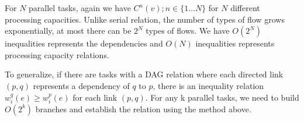 For $N$ parallel tasks, again we have $C^n(v); n\in\{1\dots N\}$ for $N$ different processing capacities. Unlike serial relation, the number of types of flow grows exponentially, at most there can be $2^N$ types of flows. We have $O(2^N)$ inequalities represents the dependencies and $O(N)$ inequalities represents processing capacity relations.

To generalize, if there are tasks with a DAG relation where each directed link $(p,q)$ represents a dependency of $q$ to $p$, there is an inequality relation $w_i^q(e) \geq w_i^p(e)$ for each link $(p,q)$. For any k parallel tasks, we need to build $O(2^k)$ branches and establish the relation using the method above.   
